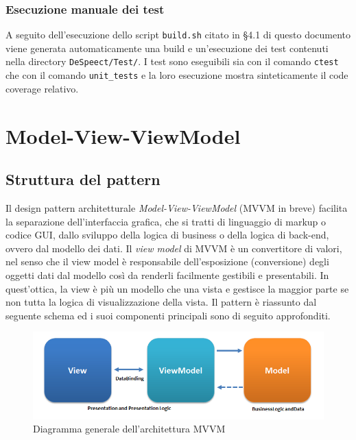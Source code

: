 \documentclass[openany,12pt,a4paper]{report}
\begin{document}
	\subsection{Esecuzione manuale dei test}
	A seguito dell'esecuzione dello script \verb|build.sh| citato in §4.1 di questo documento viene generata automaticamente una build e un'esecuzione dei test contenuti nella directory \verb|DeSpeect/Test/|. I test sono eseguibili sia con il comando \verb|ctest| che con il comando \verb|unit_tests| e la loro esecuzione mostra sinteticamente il code coverage relativo. 
	
	\appendix
	
	\chapter{Model-View-ViewModel}
	
	\section{Struttura del pattern}
	
	Il design pattern architetturale \textit{Model-View-ViewModel} (MVVM in breve) facilita la separazione dell'interfaccia grafica, che si tratti di linguaggio di markup o codice GUI, dallo sviluppo della logica di business o della logica di back-end, ovvero dal modello dei dati. Il \textit{view model} di MVVM è un convertitore di valori, nel senso che il view model è responsabile dell'esposizione (conversione) degli oggetti dati dal modello così da renderli facilmente gestibili e presentabili. In quest'ottica, la view è più un modello che una vista e gestisce la maggior parte se non tutta la logica di visualizzazione della vista. Il pattern è riassunto dal seguente schema ed i suoi componenti principali sono di seguito approfonditi.
	
	\begin{figure}[H]
		\includegraphics[scale=0.7]{MVVMPattern}
		\centering
		\caption{Diagramma generale dell'architettura MVVM}
	\end{figure}
	
\end{document}
